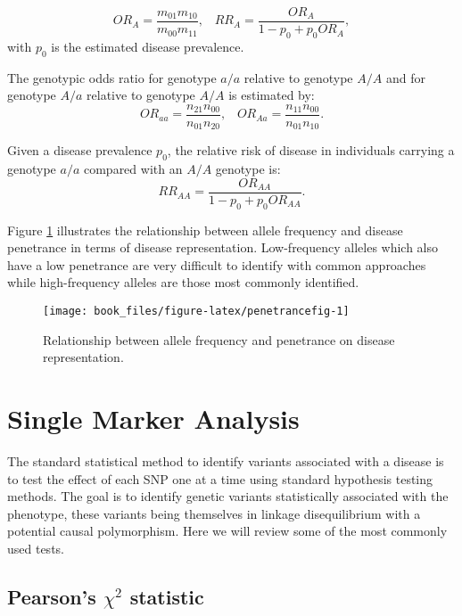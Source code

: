 \documentclass[]{book}
\begin{document}
\[OR_A = \frac{m_{01}m_{10}}{m_{00}m_{11}}, \hspace{10pt} RR_A = \frac{OR_A}{1 - p_0 + p_0 OR_A},\]
with \(p_0\) is the estimated disease prevalence.

The genotypic odds ratio for genotype \(a/a\) relative to genotype \(A/A\)
and for genotype \(A/a\) relative to genotype \(A/A\) is estimated by:
\[OR_{aa} =  \frac{n_{21}n_{00}}{n_{01}n_{20}}, \hspace{10pt} OR_{Aa} = \frac{n_{11}n_{00}}{n_{01}n_{10}}.\]

Given a disease prevalence \(p_0\), the relative risk of disease in
individuals carrying a genotype \(a/a\) compared with an \(A/A\) genotype
is: \[RR_{AA} = \frac{OR_{AA}}{1-p_0 + p_0 OR_{AA}}.\]

Figure \ref{fig:penetrancefig} illustrates the relationship between allele
frequency and disease penetrance in terms of disease representation.
Low-frequency alleles which also have a low penetrance are very
difficult to identify with common approaches while high-frequency
alleles are those most commonly identified.



\begin{figure}

{\centering \texttt{[image: book\_files/figure-latex/penetrancefig-1]} 

}

\caption{Relationship between allele frequency and penetrance on disease representation.}\label{fig:penetrancefig}
\end{figure}

\hypertarget{SMA}{%
\section{Single Marker Analysis}\label{SMA}}

The standard statistical method to identify variants associated with a
disease is to test the effect of each SNP one at a time using standard
hypothesis testing methods. The goal is to identify genetic variants
statistically associated with the phenotype, these variants being
themselves in linkage disequilibrium with a potential causal
polymorphism. Here we will review some of the most commonly used tests.

\hypertarget{pearsons-chi2-statistic}{%
\subsection{\texorpdfstring{Pearson's \(\chi^2\) statistic}{Pearson's \textbackslash{}chi\^{}2 statistic}}\label{pearsons-chi2-statistic}}
\end{document}
